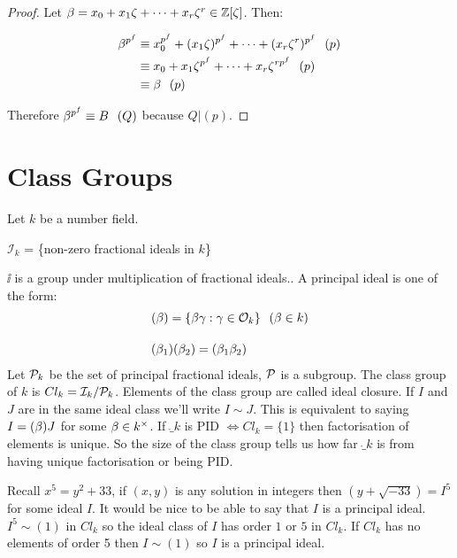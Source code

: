 \documentclass[11pt]{article}
\begin{document}
\begin{proof}
	Let $\beta = x_0 + x_1 \zeta + \dots + x_r \zeta^r \in \mathbb{Z}[\zeta]$.
	Then:

	\begin{align*}
		\beta^{p^f} &\equiv x_0^{p^f} + (x_1\zeta)^{p^f} + \dots + (x_r \zeta^r)^{p^f} \hspace{7pt} (p)\\
		& \equiv x_0 + x_1\zeta^{p^f} + \dots + x_r\zeta^{rp^f} \hspace{7pt} (p)\\
		& \equiv \beta \hspace{7pt} (p)
	\end{align*}

	Therefore $\beta^{p^f} \equiv B \hspace{7pt} (Q) $ because $Q | (p)$.

\end{proof}
\newpage

\section{Class Groups}

Let $k$ be a number field. 

\begin{defn}
	$\mathcal{I}_k$ = \{non-zero fractional ideals in $k$\}
\end{defn}
\spa
$\ii$ is a group under multiplication of fractional ideals..
\spac
A principal ideal is one of the form:
\begin{align*}
	(\beta) &= \{ \beta \gamma : \gamma \in \mathcal{O}_k \}\hspace{7pt}  (\beta \in k)\\[1em]
	(\beta_1&)(\beta_2) = (\beta_1\beta_2)
\end{align*}
Let $\mathcal{P}_k $ be the set of principal fractional ideals, $\mathcal{P}$ is a subgroup.
\spac
The class group of $k$ is $Cl_k = \mathcal{I}_k / \mathcal{P}_k$. 
Elements of the class group are called ideal closure.
\spac
If $I $ and $J$ are in the same ideal class we'll write $I \sim J$.
This is equivalent to saying $I = (\beta) J$ for some $\beta \in k^\times $.
\spac
If $\ring_k $ is PID $\iff Cl_k = \{1 \}$ then factorisation of elements is unique.
So the size of the class group tells us how far $\ring_k$ is from having unique factorisation or being PID.

\spac
Recall  $x^5 = y^2 + 33$, if $(x,y)$ is any solution in integers then $(y + \sqrt{-33}) = I^5$ for some ideal $I$.
It would be nice to be able to say that $I$ is a principal ideal.
\spac
$I^5 \sim (1) $ in $Cl_k $ so the ideal class of $I$ has order $1$ or $5$ in $Cl_k$.
If $Cl_k$ has no elements of order 5 then $I \sim (1) $ so $I$ is a principal ideal.
\end{document}
